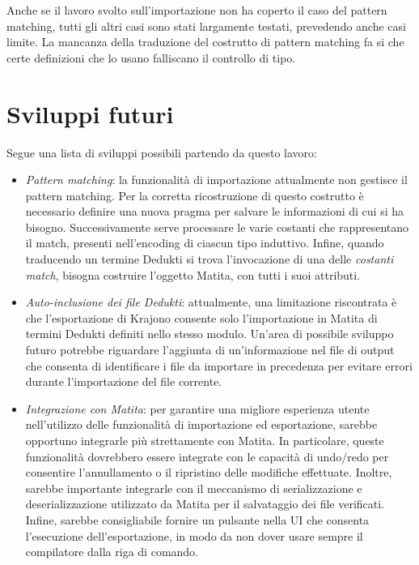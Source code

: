 \documentclass[12pt,a4paper]{mimosis}
\begin{document}
Anche se il lavoro svolto sull'importazione non ha coperto il caso del pattern
matching, tutti gli altri casi sono stati largamente testati, prevedendo anche
casi limite. La mancanza della traduzione del costrutto di pattern matching fa 
si che certe definizioni che lo usano falliscano il controllo di tipo.

\section{Sviluppi futuri}
Segue una lista di sviluppi possibili partendo da questo lavoro:
\begin{itemize}
  \item \textit{Pattern matching}: la funzionalità di importazione attualmente
    non gestisce il pattern matching. Per la corretta ricostruzione di questo
    costrutto è necessario definire una nuova pragma per salvare le informazioni
    di cui si ha bisogno. Successivamente serve processare le varie costanti che
    rappresentano il match, presenti nell'encoding di ciascun tipo induttivo.
    Infine, quando traducendo un termine Dedukti si trova l'invocazione di una
    delle \textit{costanti match}, bisogna costruire l'oggetto Matita, con tutti
    i suoi attributi.
  \item \textit{Auto-inclusione dei file Dedukti}: attualmente, una limitazione
    riscontrata è che l'esportazione di Krajono consente solo l'importazione in
    Matita di termini Dedukti definiti nello stesso modulo. Un'area di possibile
    sviluppo futuro potrebbe riguardare l'aggiunta di un'informazione nel file
    di output che consenta di identificare i file da importare in precedenza per
    evitare errori durante l'importazione del file corrente.
  \item \textit{Integrazione con Matita}: per garantire una migliore esperienza
    utente nell'utilizzo delle funzionalità di importazione ed esportazione,
    sarebbe opportuno integrarle più strettamente con Matita. In particolare,
    queste funzionalità dovrebbero essere integrate con le capacità di undo/redo
    per consentire l'annullamento o il ripristino delle modifiche effettuate.
    Inoltre, sarebbe importante integrarle con il meccanismo di serializzazione 
    e deserializzazione utilizzato da Matita per il salvataggio dei file verificati.
    Infine, sarebbe consigliabile fornire un pulsante nella UI che consenta
    l'esecuzione dell'esportazione, in modo da non dover usare sempre 
    il compilatore dalla riga di comando. 
\end{itemize}
\end{document}
